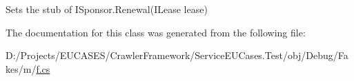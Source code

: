 Sets the stub of I\-Sponsor.\-Renewal(\-I\-Lease lease)



The documentation for this class was generated from the following file\-:\begin{DoxyCompactItemize}
\item 
D\-:/\-Projects/\-E\-U\-C\-A\-S\-E\-S/\-Crawler\-Framework/\-Service\-E\-U\-Cases.\-Test/obj/\-Debug/\-Fakes/m/\hyperlink{m_2f_8cs}{f.\-cs}\end{DoxyCompactItemize}
